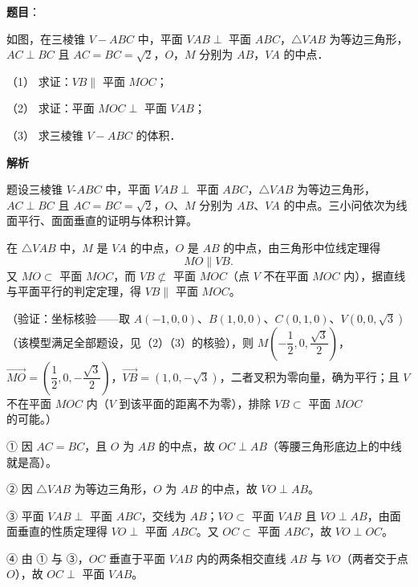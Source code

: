 \begin{answer}

\textbf{题目}：

如图，在三棱锥 \(V-ABC\) 中，平面 \(VAB\perp\) 平面 \(ABC\)，\(\triangle VAB\) 为等边三角形，\(AC\perp BC\) 且 \(AC=BC=\sqrt{2}\)，\(O\)，\(M\) 分别为 \(AB\)，\(VA\) 的中点．
\nopagebreak[4]
\begin{center}\end{center}
\nopagebreak[4]
（1） 求证：\(VB\parallel\) 平面 \(MOC\)；

（2） 求证：平面 \(MOC\perp\) 平面 \(VAB\)；

（3） 求三棱锥 \(V-ABC\) 的体积．

\textbf{解析}

题设三棱锥 \(V\text{-}ABC\) 中，平面 \(VAB\perp\) 平面 \(ABC\)，\(\triangle VAB\) 为等边三角形，\(AC\perp BC\) 且 \(AC=BC=\sqrt{2}\)，\(O\)、\(M\) 分别为 \(AB\)、\(VA\) 的中点。三小问依次为线面平行、面面垂直的证明与体积计算。


在 \(\triangle VAB\) 中，\(M\) 是 \(VA\) 的中点，\(O\) 是 \(AB\) 的中点，由三角形中位线定理得
\nopagebreak[4]
\[
MO\parallel VB .
\]
又 \(MO\subset\) 平面 \(MOC\)，而 \(VB\not\subset\) 平面 \(MOC\)（点 \(V\) 不在平面 \(MOC\) 内），据直线与平面平行的判定定理，得 \(VB\parallel\) 平面 \(MOC\)。

（验证：坐标核验——取 \(A(-1,0,0)\)、\(B(1,0,0)\)、\(C(0,1,0)\)、\(V(0,0,\sqrt{3})\)（该模型满足全部题设，见（2）（3）的核验），则 \(M\left(-\dfrac{1}{2},0,\dfrac{\sqrt{3}}{2}\right)\)，\(\overrightarrow{MO}=\left(\dfrac{1}{2},0,-\dfrac{\sqrt{3}}{2}\right)\)，\(\overrightarrow{VB}=(1,0,-\sqrt{3})\)，二者叉积为零向量，确为平行；且 \(V\) 不在平面 \(MOC\) 内（\(V\) 到该平面的距离不为零），排除 \(VB\subset\) 平面 \(MOC\) 的可能。）


① 因 \(AC=BC\)，且 \(O\) 为 \(AB\) 的中点，故 \(OC\perp AB\)（等腰三角形底边上的中线就是高）。

② 因 \(\triangle VAB\) 为等边三角形，\(O\) 为 \(AB\) 的中点，故 \(VO\perp AB\)。

③ 平面 \(VAB\perp\) 平面 \(ABC\)，交线为 \(AB\)；\(VO\subset\) 平面 \(VAB\) 且 \(VO\perp AB\)，由面面垂直的性质定理得 \(VO\perp\) 平面 \(ABC\)。又 \(OC\subset\) 平面 \(ABC\)，故 \(VO\perp OC\)。

④ 由 ① 与 ③，\(OC\) 垂直于平面 \(VAB\) 内的两条相交直线 \(AB\) 与 \(VO\)（两者交于点 \(O\)），故 \(OC\perp\) 平面 \(VAB\)。


\end{answer}
